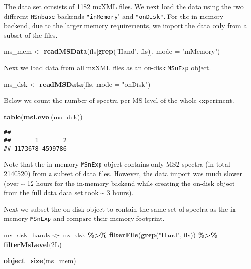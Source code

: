 \documentclass[journal=jacsat,manuscript=suppinfo]{achemso}
\newenvironment{Shaded}{\begin{snugshade}}{\end{snugshade}}
\newcommand{\DataTypeTok}[1]{\textcolor[rgb]{0.13,0.29,0.53}{#1}}
\newcommand{\KeywordTok}[1]{\textcolor[rgb]{0.13,0.29,0.53}{\textbf{#1}}}
\newcommand{\NormalTok}[1]{#1}
\newcommand{\OperatorTok}[1]{\textcolor[rgb]{0.81,0.36,0.00}{\textbf{#1}}}
\newcommand{\StringTok}[1]{\textcolor[rgb]{0.31,0.60,0.02}{#1}}
\begin{document}
The data set consists of 1182 mzXML files. We next load the data using
the two different \texttt{MSnbase} backends \texttt{"inMemory}" and
\texttt{"onDisk"}. For the in-memory backend, due to the larger memory
requirements, we import the data only from a subset of the files.

\begin{Shaded}
\begin{Highlighting}[]
\NormalTok{ms\_mem \textless{}{-}}\StringTok{ }\KeywordTok{readMSData}\NormalTok{(fls[}\KeywordTok{grep}\NormalTok{(}\StringTok{"Hand"}\NormalTok{, fls)], }\DataTypeTok{mode =} \StringTok{"inMemory"}\NormalTok{)}
\end{Highlighting}
\end{Shaded}

Next we load data from all mzXML files as an on-disk \texttt{MSnExp}
object.

\begin{Shaded}
\begin{Highlighting}[]
\NormalTok{ms\_dsk \textless{}{-}}\StringTok{ }\KeywordTok{readMSData}\NormalTok{(fls, }\DataTypeTok{mode =} \StringTok{"onDisk"}\NormalTok{)}
\end{Highlighting}
\end{Shaded}

Below we count the number of spectra per MS level of the whole
experiment.

\begin{Shaded}
\begin{Highlighting}[]
\KeywordTok{table}\NormalTok{(}\KeywordTok{msLevel}\NormalTok{(ms\_dsk))}
\end{Highlighting}
\end{Shaded}

\begin{verbatim}
## 
##       1       2 
## 1173678 4599786
\end{verbatim}

Note that the in-memory \texttt{MSnExp} object contains only MS2 spectra
(in total 2140520) from a subset of data files. However, the data import
was much slower (over \textasciitilde{} 12 hours for the in-memory
backend while creating the on-disk object from the full data data set
took \textasciitilde{} 3 hours).

Next we subset the on-disk object to contain the same set of spectra as
the in-memory \texttt{MSnExp} and compare their memory footprint.

\begin{Shaded}
\begin{Highlighting}[]
\NormalTok{ms\_dsk\_hands \textless{}{-}}\StringTok{ }\NormalTok{ms\_dsk }\OperatorTok{\%\textgreater{}\%}
\StringTok{    }\KeywordTok{filterFile}\NormalTok{(}\KeywordTok{grep}\NormalTok{(}\StringTok{"Hand"}\NormalTok{, fls)) }\OperatorTok{\%\textgreater{}\%}
\StringTok{    }\KeywordTok{filterMsLevel}\NormalTok{(2L)}

\KeywordTok{object\_size}\NormalTok{(ms\_mem)}
\end{Highlighting}
\end{Shaded}
\end{document}
